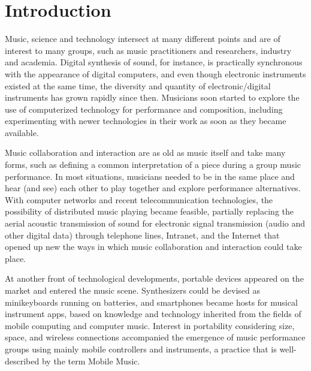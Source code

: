 \chapter{Introduction}
\label{cap:introduction}

Music, science and technology intersect at many different points and are of interest to many groups, such as music practitioners and researchers, industry and academia.
Digital synthesis of sound, for instance, is practically synchronous with the appearance of digital computers, and even though electronic instruments existed at the same time, the diversity and quantity of electronic/digital instruments has grown rapidly since then.
Musicians soon started to explore the use of computerized technology for performance and composition, including experimenting with newer technologies in their work as soon as they became available.

Music collaboration and interaction are as old as music itself and take many forms, such as defining a common interpretation of a piece during a group music performance. 
In most situations, musicians needed to be in the same place and hear (and see) each other to play together and explore performance alternatives.
With computer networks and recent telecommunication technologies, the possibility of distributed music playing became feasible, partially replacing the aerial acoustic transmission of sound for electronic signal transmission (audio and other digital data) through telephone lines, Intranet, and the Internet that opened up new the ways in which music collaboration and interaction could take place.

At another front of technological developments, portable devices appeared on the market and entered the music scene.
Synthesizers could be devised as minikeyboards running on batteries, and smartphones became hosts for musical instrument apps, based on knowledge and technology inherited from the fields of mobile computing and computer music. 
Interest in portability considering size, space, and wireless connections accompanied the emergence of music performance groups using mainly mobile controllers and instruments, a practice that is well-described by the term Mobile Music.

